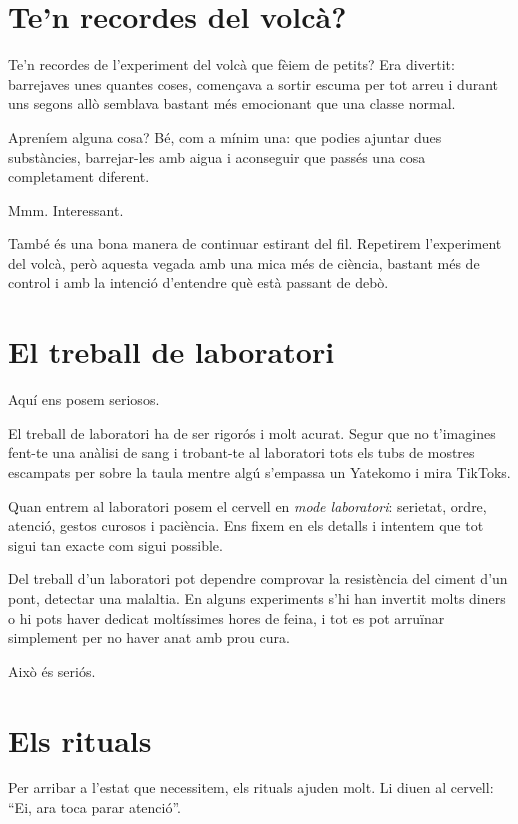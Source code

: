 
\section{Te'n recordes del volcà?}

Te'n recordes de l'experiment del volcà que fèiem de petits? Era divertit: barrejaves unes quantes coses, començava a sortir escuma per tot arreu i durant uns segons allò semblava bastant més emocionant que una classe normal.

Apreníem alguna cosa? Bé, com a mínim una: que podies ajuntar dues substàncies, barrejar-les amb aigua i aconseguir que passés una cosa completament diferent.

Mmm. Interessant.

També és una bona manera de continuar estirant del fil. Repetirem l'experiment del volcà, però aquesta vegada amb una mica més de ciència, bastant més de control i amb la intenció d'entendre què està passant de debò.

\section{El treball de laboratori}

Aquí ens posem seriosos.

El treball de laboratori ha de ser rigorós i molt acurat. Segur que no t'imagines fent-te una anàlisi de sang i trobant-te al laboratori tots els tubs de mostres escampats per sobre la taula mentre algú s'empassa un Yatekomo i mira TikToks.

Quan entrem al laboratori posem el cervell en \emph{mode laboratori}: serietat, ordre, atenció, gestos curosos i paciència. Ens fixem en els detalls i intentem que tot sigui tan exacte com sigui possible.

Del treball d'un laboratori pot dependre comprovar la resistència del ciment d'un pont, detectar una malaltia. En alguns experiments s’hi han invertit molts diners o hi pots haver dedicat moltíssimes hores de feina, i tot es pot arruïnar simplement per no haver anat amb prou cura.

Això és seriós.

\section{Els rituals}

Per arribar a l'estat que necessitem, els rituals ajuden molt. Li diuen al cervell: ``Ei, ara toca parar atenció''.

